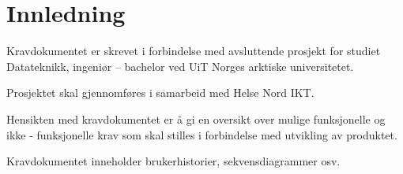 \section{Innledning}

Kravdokumentet er skrevet i forbindelse med avsluttende prosjekt for studiet Datateknikk, ingeniør – bachelor ved UiT Norges arktiske universitetet.

Prosjektet skal gjennomføres i samarbeid med Helse Nord IKT.

Hensikten med kravdokumentet er å gi en oversikt over mulige funksjonelle og ikke - funksjonelle krav som skal stilles i forbindelse med utvikling av produktet.

Kravdokumentet inneholder brukerhistorier, sekvensdiagrammer osv.